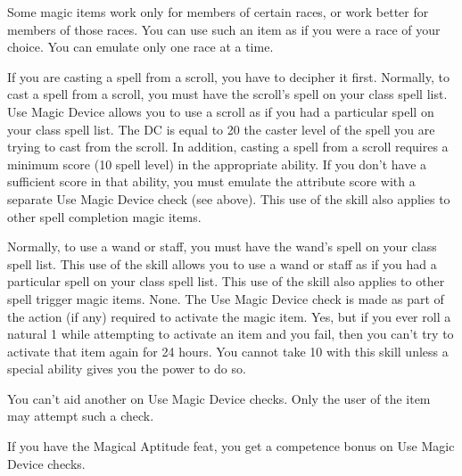  Some magic items work only for members of certain races, or work better for members of those races. You can use such an item as if you were a race of your choice. You can emulate only one race at a time.

 If you are casting a spell from a scroll, you have to decipher it first. Normally, to cast a spell from a scroll, you must have the scroll's spell on your class spell list. Use Magic Device allows you to use a scroll as if you had a particular spell on your class spell list. The DC is equal to 20 \add the caster level of the spell you are trying to cast from the scroll. In addition, casting a spell from a scroll requires a minimum score (10 \add spell level) in the appropriate ability. If you don't have a sufficient score in that ability, you must emulate the attribute score with a separate Use Magic Device check (see above).
This use of the skill also applies to other spell completion magic items.

 Normally, to use a wand or staff, you must have the wand's spell on your class spell list. This use of the skill allows you to use a wand or staff as if you had a particular spell on your class spell list. This use of the skill also applies to other spell trigger magic items.
 None. The Use Magic Device check is made as part of the action (if
any) required to activate the magic item.
 Yes, but if you ever roll a natural 1 while attempting to activate an item and you fail, then you can't try to activate that item again for 24 hours.
 You cannot take 10 with this skill unless a special ability gives you the power to do so.

You can't aid another on Use Magic Device checks. Only the user of the item may attempt such a check.

If you have the Magical Aptitude feat, you get a  competence bonus on Use Magic Device checks.


